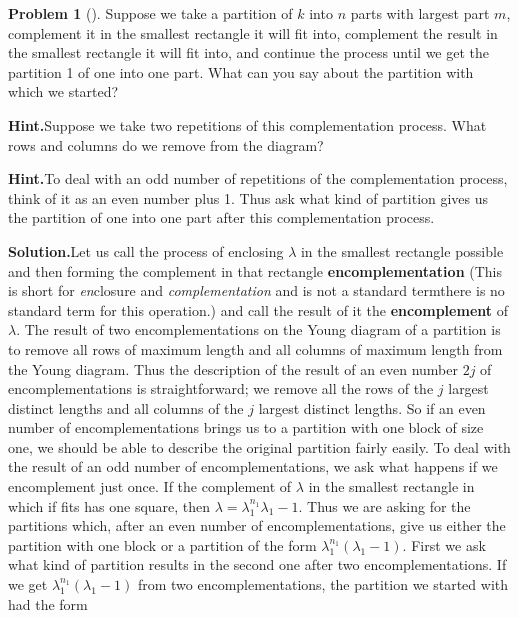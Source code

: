 \documentclass[10pt,]{book}
\newcommand{\terminology}[1]{\textbf{#1}}
\theoremstyle{plain}
\theoremstyle{definition}
\newtheorem{activity}[project]{Problem}
\theoremstyle{definition}
\numberwithin{equation}{chapter}
\begin{document}
\begin{activity}[]\label{activity-169}
Suppose we take a partition of \(k\) into \(n\) parts with largest part \(m\), complement it in the smallest rectangle it will fit into, complement the result in the smallest rectangle it will fit into, and continue the process until we get the partition 1 of one into one part.  What can you say about the partition with which we started?%
\par\medskip\noindent%
\textbf{Hint.}\quad Suppose we take two repetitions of this complementation process. What rows and columns do we remove from the diagram?%
\par\medskip\noindent%
\textbf{Hint.}\quad To deal with an odd number of repetitions of the complementation process, think of it as an even number plus 1. Thus ask what kind of partition gives us the partition of one into one part after this complementation process.%
\par\medskip\noindent%
\textbf{Solution.}\quad Let us call the process of enclosing \(\lambda\) in the smallest rectangle possible and then forming the complement in that rectangle \terminology{encomplementation} (This is short for \emph{en}\/closure and \emph{complementation} and is not a standard term\textemdash{}there is no standard term for this operation.) and call the result of it the \terminology{encomplement} of \(\lambda\).  The result of two encomplementations on the Young diagram of a partition is to remove all rows of maximum length and all columns of maximum length from the Young diagram. Thus the description of the result of an even number \(2j\) of encomplementations is straightforward; we remove all the rows of the \(j\) largest distinct lengths and all columns of the \(j\) largest distinct lengths. So if an even number of encomplementations brings us to a partition with one block of size one, we should be able to describe the original partition fairly easily. To deal with the result of an odd number of encomplementations, we ask what happens if we encomplement just once.  If the complement of \(\lambda\) in the smallest rectangle in which if fits has one square, then \(\lambda =\lambda_1^{n_1}\lambda_1-1\). Thus we are asking for the partitions which, after an even number of encomplementations, give us either the partition with one block or a partition of the form \(\lambda_1^{n_1}(\lambda_1-1)\). First we ask what kind of partition results in the second one after two encomplementations. If we get \(\lambda_1^{n_1}(\lambda_1-1)\) from two encomplementations, the partition we started with had the form%

\end{activity}
\end{document}
